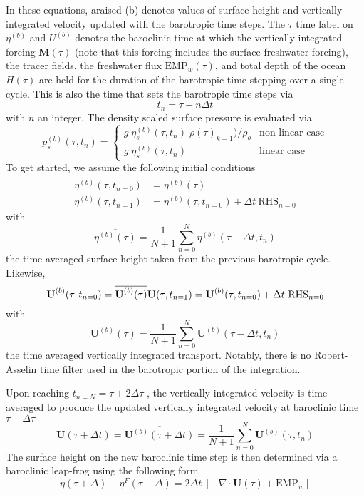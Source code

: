 \documentclass[../main/NEMO_manual]{subfiles}
\begin{document}
In these equations, araised (b) denotes values of surface height and
vertically integrated velocity updated with the barotropic time steps.
The $\tau$ time label on $\eta^{(b)}$ and $U^{(b)}$ denotes the baroclinic time at which
the vertically integrated forcing $\textbf{M}(\tau)$
(note that this forcing includes the surface freshwater forcing), the tracer fields,
the freshwater flux $\text{EMP}_w(\tau)$, and total depth of the ocean $H(\tau)$ are held for
the duration of the barotropic time stepping over a single cycle.
This is also the time that sets the barotropic time steps via
\[
  t_n=\tau+n\Delta t
\]
with $n$ an integer.
The density scaled surface pressure is evaluated via
\[
  p_s^{(b)}(\tau,t_{n}) =
  \begin{cases}
    g \;\eta_s^{(b)}(\tau,t_{n}) \;\rho(\tau)_{k=1}) / \rho_o  &      \text{non-linear case} \\
    g \;\eta_s^{(b)}(\tau,t_{n})  &      \text{linear case}
  \end{cases}
\]
To get started, we assume the following initial conditions
\[
  \begin{split}
    \eta^{(b)}(\tau,t_{n=0}) &= \overline{\eta^{(b)}(\tau)} \\
    \eta^{(b)}(\tau,t_{n=1}) &= \eta^{(b)}(\tau,t_{n=0}) + \Delta t \ \text{RHS}_{n=0}
  \end{split}
\]
with
\[
  \overline{\eta^{(b)}(\tau)} = \frac{1}{N+1} \sum\limits_{n=0}^N \eta^{(b)}(\tau-\Delta t,t_{n})
\]
the time averaged surface height taken from the previous barotropic cycle.
Likewise,
\[
  \textbf{U}^{(b)}(\tau,t_{n=0}) = \overline{\textbf{U}^{(b)}(\tau)}	\\ \\
  \textbf{U}(\tau,t_{n=1}) = \textbf{U}^{(b)}(\tau,t_{n=0}) + \Delta t \ \text{RHS}_{n=0}
\]
with
\[
  \overline{\textbf{U}^{(b)}(\tau)} = \frac{1}{N+1} \sum\limits_{n=0}^N\textbf{U}^{(b)}(\tau-\Delta t,t_{n})
\]
the time averaged vertically integrated transport.
Notably, there is no Robert-Asselin time filter used in the barotropic portion of the integration.

Upon reaching $t_{n=N} = \tau + 2\Delta \tau$ , the vertically integrated velocity is time averaged to
produce the updated vertically integrated velocity at baroclinic time $\tau + \Delta \tau$
\[
  \textbf{U}(\tau+\Delta t) = \overline{\textbf{U}^{(b)}(\tau+\Delta t)}
  = \frac{1}{N+1} \sum\limits_{n=0}^N\textbf{U}^{(b)}(\tau,t_{n})
\]
The surface height on the new baroclinic time step is then determined via
a baroclinic leap-frog using the following form
\begin{equation}
  \label{eq:MBZ_dyn_spg_ts_ssh}
  \eta(\tau+\Delta) - \eta^{F}(\tau-\Delta) = 2\Delta t \ \left[ - \nabla \cdot \textbf{U}(\tau) + \text{EMP}_w \right]
\end{equation}
\end{document}
